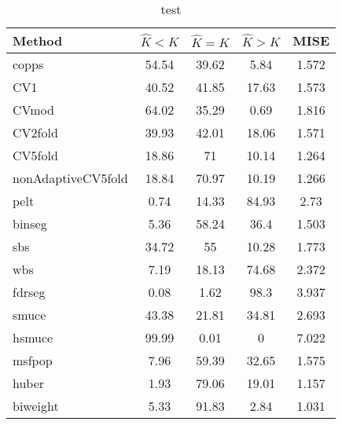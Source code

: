 \begin{table}[ht]
\centering
\begin{tabular}{l|cccc}
  \hline
Method & $\hat{K} < K$ & $\hat{K} = K$ & $\hat{K} > K$ & MISE \\ 
  \hline
copps & 54.54 & 39.62 &  5.84 & 1.572 \\ 
  CV1 & 40.52 & 41.85 & 17.63 & 1.573 \\ 
  CVmod & 64.02 & 35.29 &  0.69 & 1.816 \\ 
  CV2fold & 39.93 & 42.01 & 18.06 & 1.571 \\ 
  CV5fold & 18.86 &    71 & 10.14 & 1.264 \\ 
  nonAdaptiveCV5fold & 18.84 & 70.97 & 10.19 & 1.266 \\ 
  pelt &  0.74 & 14.33 & 84.93 &  2.73 \\ 
  binseg &  5.36 & 58.24 &  36.4 & 1.503 \\ 
  sbs & 34.72 &    55 & 10.28 & 1.773 \\ 
  wbs &  7.19 & 18.13 & 74.68 & 2.372 \\ 
  fdrseg &  0.08 &  1.62 &  98.3 & 3.937 \\ 
  smuce & 43.38 & 21.81 & 34.81 & 2.693 \\ 
  hsmuce & 99.99 &  0.01 &     0 & 7.022 \\ 
  msfpop &  7.96 & 59.39 & 32.65 & 1.575 \\ 
  huber &  1.93 & 79.06 & 19.01 & 1.157 \\ 
  biweight &  5.33 & 91.83 &  2.84 & 1.031 \\ 
   \hline
\end{tabular}
\caption{test} 
\end{table}
